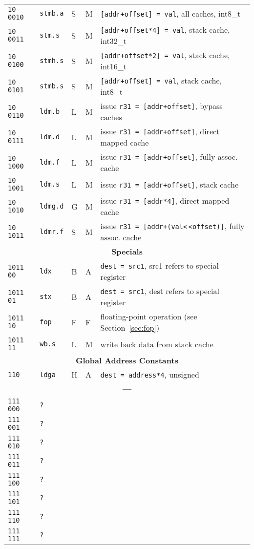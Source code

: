 \documentclass[10pt,DIV12]{scrartcl}
\newcommand{\shl}{\textless$\,\!$\textless}
\begin{document}
\begin{longtable}{llllp{}}
\texttt{10 0010} & \texttt{stmb.a} & S & M & \texttt{[addr+offset] = val}, all caches, int8\_t \\
\texttt{10 0011} & \texttt{stm.s} & S & M & \texttt{[addr+offset*4] = val}, stack cache, int32\_t \\
\texttt{10 0100} & \texttt{stmh.s} & S & M & \texttt{[addr+offset*2] = val}, stack cache, int16\_t \\
\texttt{10 0101} & \texttt{stmb.s} & S & M & \texttt{[addr+offset] = val}, stack cache, int8\_t \\
\texttt{10 0110} & \texttt{ldm.b} & L & M & issue \texttt{r31 = [addr+offset]}, bypass caches \\
\texttt{10 0111} & \texttt{ldm.d} & L & M & issue \texttt{r31 = [addr+offset]}, direct mapped cache \\
\texttt{10 1000} & \texttt{ldm.f} & L & M & issue \texttt{r31 = [addr+offset]}, fully assoc. cache \\
\texttt{10 1001} & \texttt{ldm.s} & L & M & issue \texttt{r31 = [addr+offset]}, stack cache \\
\texttt{10 1010} & \texttt{ldmg.d} & G & M & issue \texttt{r31 = [addr*4]}, direct mapped cache\\
\texttt{10 1011} & \texttt{ldmr.f} & S & M & issue \texttt{r31 = [addr+(val\shl{}offset)]}, fully assoc. cache\\
\midrule
\multicolumn{5}{c}{\textsf{\textbf{Specials}}} \\
\cmidrule{1-5}
\texttt{1011 00} & \texttt{ldx} & B & A & \texttt{dest = src1}, src1 refers to special register \\
\texttt{1011 01} & \texttt{stx} & B & A & \texttt{dest = src1}, dest refers to special register \\
\texttt{1011 10} & \texttt{fop} & F & F & floating-point operation (see Section~\ref{sec:fop}) \\
\texttt{1011 11} & \texttt{wb.s} & L & M & write back data from stack cache \\
\midrule
\multicolumn{5}{c}{\textsf{\textbf{Global Address Constants}}} \\
\cmidrule{1-5}
\texttt{110} & \texttt{ldga} & H & A & \texttt{dest = address*4}, unsigned \\
\midrule
\multicolumn{5}{c}{\textbf{---}} \\
\cmidrule{1-5}
\texttt{111 000} & \texttt{?} & & & \\
\texttt{111 001} & \texttt{?} & & & \\
\texttt{111 010} & \texttt{?} & & & \\
\texttt{111 011} & \texttt{?} & & & \\
\texttt{111 100} & \texttt{?} & & & \\
\texttt{111 101} & \texttt{?} & & & \\
\texttt{111 110} & \texttt{?} & & & \\
\texttt{111 111} & \texttt{?} & & & \\
\bottomrule
\end{longtable}  
\end{document}

